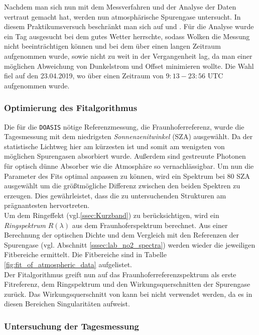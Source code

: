 \documentclass[12pt, a4paper, bibliography=totoc]{scrartcl}
\begin{document}
\begin{multicols}{2}
Nachdem man sich nun mit dem Messverfahren und der Analyse der Daten vertraut gemacht hat, werden nun atmosphärische Spurengase untersucht. In diesem Praktikumsversuch beschränkt man sich auf  und .
Für die Analyse wurde ein Tag ausgesucht bei dem gutes Wetter herrschte, sodass Wolken die Messung nicht beeinträchtigen können und bei dem über einen langen Zeitraum aufgenommen wurde, sowie nicht zu weit in der Vergangenheit lag, da man einer möglichen Abweichung von Dunkelstrom und Offset minimieren wollte.
Die Wahl fiel auf den 23.04.2019, wo über einen Zeitraum von $9:13 - 23:56$ UTC aufgenommen wurde.

\subsubsection{Optimierung des Fitalgorithmus}\label{sssec:configure_fit}

Die für die \verb*+DOASIS+ nötige Referenzmessung, die Fraunhoferreferenz, wurde die Tagesmessung mit dem niedrigsten
\textit{Sonnenzenitwinkel} (SZA) ausgewählt. 
Da der statistische Lichtweg hier am kürzesten ist und somit am wenigsten von möglichen Spurengasen absorbiert wurde.
Außerdem sind gestreuute Photonen für optisch dünne Absorber wie die Atmosphäre so vernachlässigbar.
Um nun die Parameter des Fits optimal anpassen zu können, wird ein Spektrum bei $80$ SZA ausgewählt um die größtmögliche Differenz zwischen den beiden Spektren zu erzeugen. 
Dies gewährleistet, dass die zu untersuchenden Strukturen am prägnantesten hervortreten. \\
Um dem Ringeffekt (vgl.\ref{ssec:Kurzband}) zu berücksichtigen, wird ein \textit{Ringspektrum} $R(\lambda)$ aus dem Fraunhoferspektrum berechnet.
Aus einer Berechnung der optischen Dichte und dem Vergleich mit den Referenzen der Spurengase (vgl. Abschnitt \ref{sssec:lab_no2_spectra}) werden wieder die jeweiligen Fitbereiche ermittelt. 
Die Fitbereiche sind in Tabelle \ref{fig:fit_of_atmospheric_data} aufgelistet.\\
Der Fitalgorithmus greift nun auf das Fraunhoferreferenzspektrum als erste Fitreferenz, dem Ringspektrum und den Wirkungsquerschnitten der Spurengase zurück. 
Das Wirkungsquerschnitt von  kann bei  nicht verwendet werden, da es in diesen Bereichen Singularitäten aufweist.

\subsubsection{Untersuchung der Tagesmessung}\label{sssec:tagesmessung}


\end{multicols}
\end{document}
